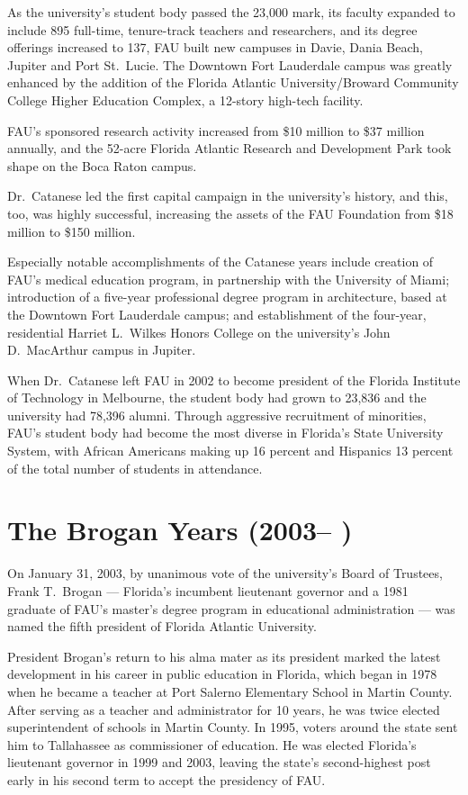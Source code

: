 \documentclass[phd, 12pt, print]{fauthesis}
\begin{document}
As the university's student body passed the 23,000 mark, its faculty expanded to include 895 full-time, tenure-track teachers and researchers, and its degree offerings increased to 137, FAU built new campuses in Davie, Dania Beach, Jupiter and Port St.\ Lucie.  The Downtown Fort Lauderdale campus was greatly enhanced by the addition of the Florida Atlantic University/Broward Community College Higher Education Complex, a 12-story high-tech facility.

FAU's sponsored research activity increased from \$10 million to \$37 million annually, and the 52-acre Florida Atlantic Research and Development Park took shape on the Boca Raton campus.

Dr.\ Catanese led the first capital campaign in the university's history, and this, too, was highly successful, increasing the assets of the FAU Foundation from \$18 million to \$150 million.

Especially notable accomplishments of the Catanese years include creation of FAU's medical education program, in partnership with the University of Miami; introduction of a five-year professional degree program in architecture, based at the Downtown Fort Lauderdale campus; and establishment of the four-year, residential Harriet L.\ Wilkes Honors College on the university's John D.\ MacArthur campus in Jupiter.

When Dr.\ Catanese left FAU in 2002 to become president of the Florida Institute of Technology in Melbourne, the student body had grown to 23,836 and the university had 78,396 alumni.  Through aggressive recruitment of minorities, FAU's student body had become the most diverse in Florida's State University System, with African Americans making up 16 percent and Hispanics 13 percent of the total number of students in attendance.

\section{The Brogan Years (2003-- )}

On January 31, 2003, by unanimous vote of the university's Board of Trustees, Frank T.\ Brogan --- Florida's incumbent lieutenant governor and a 1981 graduate of FAU's master's degree program in educational administration --- was named the fifth president of Florida Atlantic University.

President Brogan's return to his alma mater as its president marked the latest development in his career in public education in Florida, which began in 1978 when he became a teacher at Port Salerno Elementary School in Martin County.  After serving as a teacher and administrator for 10 years, he was twice elected superintendent of schools in Martin County.  In 1995, voters around the state sent him to Tallahassee as commissioner of education.  He was elected Florida's lieutenant governor in 1999 and 2003, leaving the state's second-highest post early in his second term to accept the presidency of FAU.
\end{document}

